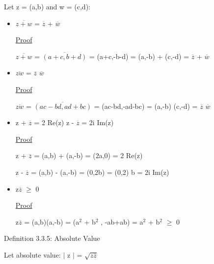 	\qquad Let z = (a,b) and w = (c,d):
	\begin{itemize}[leftmargin=2cm]
		\item $\overline{z+w}$ = $\overline{z}$ + $\overline{w}$

			{ \color{magenta} \underline{Proof} } 
			
				$\overline{z+w}$ = $\overline{(a+c,b+d)}$ = (a+c,-b-d)
				= (a,-b) + (c,-d) = $\overline{z}$ + $\overline{w}$

		\item $\overline{zw}$ = $\overline{z}$ $\overline{w}$

			{ \color{magenta} \underline{Proof} } 
			
				$\overline{zw}$ = $\overline{(ac-bd,ad+bc)}$ = (ac-bd,-ad-bc)
				= (a,-b) (c,-d) = $\overline{z}$ $\overline{w}$

		\item z + $\overline{z}$ = 2 Re(z) \qquad \qquad z - $\overline{z}$ = 2i Im(z)

			{ \color{magenta} \underline{Proof} } 
			
				z + $\overline{z}$ = (a,b) + (a,-b) = (2a,0) = 2 Re(z)

				z - $\overline{z}$ = (a,b) - (a,-b) = (0,2b) = (0,2) b = 2i Im(z)

		\item z$\overline{z}$ $\geq$ 0

			{ \color{magenta} \underline{Proof} } 
			
				z$\overline{z}$ = (a,b)(a,-b) = (a$^2$ + b$^2$ , -ab+ab) = a$^2$ + b$^2$ $\geq$ 0
	\end{itemize}

{ \color{blue} Definition 3.3.5: Absolute Value } 
	
	\qquad Let absolute value: $|$ z $|$ = $\sqrt{z \overline{z}}$ \\

